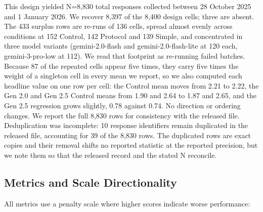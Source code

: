 \documentclass[sigconf,screen]{acmart}
\begin{document}
This design yielded N=8,830 total responses collected between 28 October 2025 and 1 January 2026. We recover 8,397 of the 8,400 design cells; three are absent. The 433 surplus rows are re-runs of 136 cells, spread almost evenly across conditions at 152 Control, 142 Protocol and 139 Simple, and concentrated in three model variants (gemini-2.0-flash and gemini-2.0-flash-lite at 120 each, gemini-3-pro-low at 112). We read that footprint as re-running failed batches. Because 87 of the repeated cells appear five times, they carry five times the weight of a singleton cell in every mean we report, so we also computed each headline value on one row per cell: the Control mean moves from 2.21 to 2.22, the Gen 2.0 and Gen 2.5 Control means from 1.90 and 2.64 to 1.87 and 2.65, and the Gen 2.5 regression grows slightly, 0.78 against 0.74. No direction or ordering changes. We report the full 8,830 rows for consistency with the released file. Deduplication was incomplete: 10 response identifiers remain duplicated in the released file, accounting for 39 of the 8,830 rows. The duplicated rows are exact copies and their removal shifts no reported statistic at the reported precision, but we note them so that the released record and the stated N reconcile.

\subsection{Metrics and Scale Directionality} \label{sec:metrics}

All metrics use a penalty scale where higher scores indicate worse performance:
\end{document}
